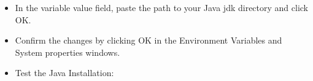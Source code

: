 \begin{flushleft}
\begin{itemize}
		\item In the variable value field, paste the path to your Java jdk directory and click OK.
		\newpage
		
		\item Confirm the changes by clicking OK in the Environment Variables and System properties windows.
		
		\item Test the Java Installation:
		
		
		
	\end{itemize}
	
\end{flushleft}
